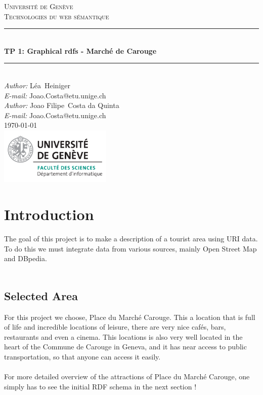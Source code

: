 \documentclass[a4paper]{article}
\makeatletter
\newcommand\TPid{1}
\newcommand\TPname{Graphical rdfs - Marché de Carouge}
\newcommand\Firstname{Joao Filipe}
\newcommand\Familyname{Costa da Quinta}
\newcommand\Email{Joao.Costa@etu.unige.ch}
\newcommand\Firstnames{Léa}
\newcommand\Familynames{Heiniger}
\newcommand\Emails{Joao.Costa@etu.unige.ch}
\makeatother
\begin{document}
\begin{titlepage}

\newcommand{\HRule}{\rule{\linewidth}{0.5mm}} 							%

\center 
 
\textsc{\LARGE Université de Genève}\\[1cm]

\textsc{\Large Technologies du web sémantique}\\[0.2cm]									%
\HRule \\[0.8cm]
{ \huge \bfseries TP \TPid : \TPname}\\[0.7cm]								%
\HRule \\[2cm]
\large
\emph{Author:} \Firstnames \  \Familynames\\[0.5cm]		
\emph{E-mail:} {\color{blue}\Emails}\\[0.5cm]
\emph{Author:} \Firstname \  \Familyname\\[0.5cm]		
\emph{E-mail:} {\color{blue}\Email}\\[6cm]	

{\large \today}\\[2cm]
\includegraphics[width=0.4\textwidth]{images/unige_csd.png}\\[1cm] 	%
\vfill 
\end{titlepage}


\newpage
\section*{Introduction}
The goal of this project is to make a description of a tourist area using URI data. To do this we must integrate data from various sources, mainly Open Street Map and DBpedia.\\\\

\subsection*{Selected Area}
For this project we choose, Place du Marché Carouge. This a location that is full of life and incredible locations of leisure, there are very nice cafés, bars, restaurants and even a cinema. This locations is also very well located in the heart of the Commune de Carouge in Geneva, and it has near access to public transportation, so that anyone can access it easily. \\\\ For more detailed overview of the attractions of Place du Marché Carouge, one simply has to see the initial RDF schema in the next section !
\end{document}
